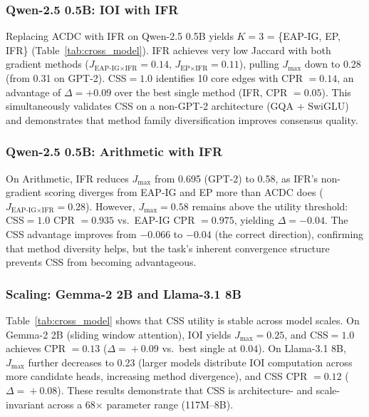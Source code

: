 \documentclass[11pt,a4paper]{article}
\newcommand{\css}{\textsc{CSS}}
\begin{document}
\subsubsection{Qwen-2.5 0.5B: IOI with IFR}

Replacing ACDC with IFR on Qwen-2.5 0.5B yields $K\!=\!3$ = \{EAP-IG, EP, IFR\} (Table~\ref{tab:cross_model}).
IFR achieves very low Jaccard with both gradient methods ($J_{\text{EAP-IG}\times\text{IFR}}\!=\!0.14$, $J_{\text{EP}\times\text{IFR}}\!=\!0.11$), pulling $J_{\max}$ down to 0.28 (from 0.31 on GPT-2).
\css{}$=1.0$ identifies 10 core edges with CPR $= 0.14$, an advantage of $\Delta = +0.09$ over the best single method (IFR, CPR $= 0.05$).
This simultaneously validates \css{} on a non-GPT-2 architecture (GQA + SwiGLU) and demonstrates that method family diversification improves consensus quality.

\subsubsection{Qwen-2.5 0.5B: Arithmetic with IFR}

On Arithmetic, IFR reduces $J_{\max}$ from 0.695 (GPT-2) to 0.58, as IFR's non-gradient scoring diverges from EAP-IG and EP more than ACDC does ($J_{\text{EAP-IG}\times\text{IFR}}\!=\!0.28$).
However, $J_{\max}\!=\!0.58$ remains above the utility threshold: \css{}$=1.0$ CPR $= 0.935$ vs.\ EAP-IG CPR $= 0.975$, yielding $\Delta = -0.04$.
The CSS advantage improves from $-0.066$ to $-0.04$ (the correct direction), confirming that method diversity helps, but the task's inherent convergence structure prevents CSS from becoming advantageous.

\subsubsection{Scaling: Gemma-2 2B and Llama-3.1 8B}

Table~\ref{tab:cross_model} shows that \css{} utility is stable across model scales.
On Gemma-2 2B (sliding window attention), IOI yields $J_{\max}\!=\!0.25$, and \css{}$=1.0$ achieves CPR $= 0.13$ ($\Delta\!=\!+0.09$ vs.\ best single at $0.04$).
On Llama-3.1 8B, $J_{\max}$ further decreases to 0.23 (larger models distribute IOI computation across more candidate heads, increasing method divergence), and CSS CPR $= 0.12$ ($\Delta\!=\!+0.08$).
These results demonstrate that \css{} is architecture- and scale-invariant across a 68$\times$ parameter range (117M--8B).
\end{document}
